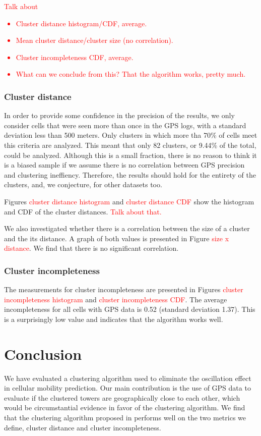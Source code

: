 \documentclass[letterpaper, 11pt, conference]{ieeeconf}
\newcommand{\xxx}[1]{\textcolor{red}{#1}}
\begin{document}
\xxx{Talk about\begin{itemize}
	\item Cluster distance histogram/CDF, average.
	\item Mean cluster distance/cluster size (no correlation).
	\item Cluster incompleteness CDF, average.
	\item What can we conclude from this? That the algorithm works, pretty much.
\end{itemize}}

\subsubsection{Cluster distance}

In order to provide some confidence in the precision of the results, we only consider cells that were seen more than once in the GPS logs, with a standard deviation less than 500 meters. Only clusters in which more tha 70\% of cells meet this criteria are analyzed. This meant that only 82 clusters, or 9.44\% of the total, could be analyzed. Although this is a small fraction, there is no reason to think it is a biased sample if we assume there is no correlation between GPS precision and clustering ineffiency. Therefore, the results should hold for the entirety of the clusters, and, we conjecture, for other datasets too.

Figures \xxx{cluster distance histogram} and \xxx{cluster distance CDF} show the histogram and CDF of the cluster distances. \xxx{Talk about that.}

We also investigated whether there is a correlation between the size of a cluster and the its distance. A graph of both values is presented in Figure \xxx{size x distance}. We find that there is no significant correlation.

\subsubsection{Cluster incompleteness}

The measurements for cluster incompleteness are presented in Figures \xxx{cluster incompleteness histogram} and \xxx{cluster incompleteness CDF}. The average incompleteness for all cells with GPS data is 0.52 (standard deviation 1.37). This is a surprisingly low value and indicates that the algorithm works well.

\section{Conclusion}
\label{sec:conclusion}
We have evaluated a clustering algorithm used to eliminate the oscillation effect in cellular mobility prediction. Our main contribution is the use of GPS data to evaluate if the clustered towers are geographically close to each other, which would be circumstantial evidence in favor of the clustering algorithm. We find that the clustering algorithm proposed in \cite{mobilityprofiler} performs well on the two metrics we define, cluster distance and cluster incompleteness.
\end{document}
